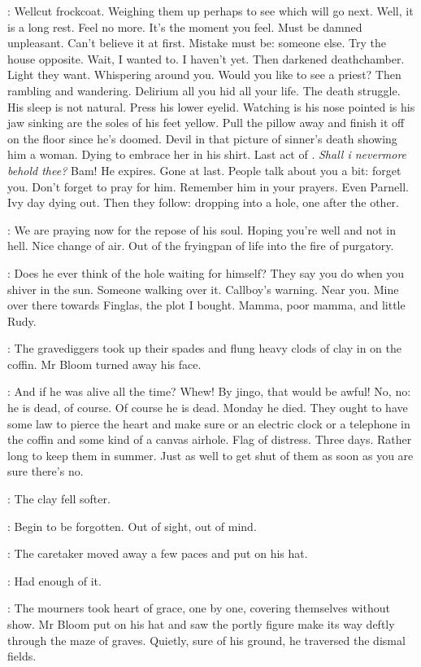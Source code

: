 \BloomInt:
Wellcut frockcoat.
Weighing them up perhaps to see which will go next.
Well, it is a long rest.
Feel no more.
It's the moment you feel.
Must be damned unpleasant.
Can't believe it at first.
Mistake must be:
someone else.
Try the house opposite.
Wait, I wanted to.
I haven't yet.
Then darkened deathchamber.
Light they want.
Whispering around you.
Would you like to see a priest?
Then rambling and wandering.
Delirium all you hid all your life.
The death struggle.
His sleep is not natural.
Press his lower eyelid.
Watching
is his nose pointed
is his jaw sinking
are the soles of his feet yellow.
Pull the pillow away and finish it off on the floor
since he's doomed.
Devil in that picture of sinner's death
showing him a woman.
Dying to embrace her in his shirt.
Last act of .
\emph{Shall i nevermore behold thee?}
Bam!
He expires.
Gone at last.
People talk about you a bit:
forget you.
Don't forget to pray for him.
Remember him in your prayers.
Even Parnell.
Ivy day dying out.
Then they follow:
dropping into a hole, one after the other.

\BloomInt:
We are praying now for the repose of his soul.
Hoping you're well and not in hell.
Nice change of air.
Out of the fryingpan of life into the fire of purgatory.

\BloomInt:
Does he ever think of the hole waiting for himself?
They say you do when you shiver in the sun.
Someone walking over it.
Callboy's warning.
Near you.
Mine over there towards Finglas, the plot I bought.
Mamma, poor mamma, and little Rudy.

:
The gravediggers took up their spades
and flung heavy clods of clay in on the coffin.
Mr Bloom turned away his face.

\BloomInt:
And if he was alive all the time?
Whew!
By jingo, that would be awful!
No, no:
he is dead, of course.
Of course he is dead.
Monday he died.
They ought to have some law to pierce the heart and make sure
or an electric clock or a telephone in the coffin
and some kind of a canvas airhole.
Flag of distress.
Three days.
Rather long to keep them in summer.
Just as well to get shut of them as soon as you are sure there's no.

:
The clay fell softer.

\BloomInt:
Begin to be forgotten.
Out of sight, out of mind.

:
The caretaker moved away a few paces and put on his hat.

\BloomInt:
Had enough of it.

:
The mourners took heart of grace,
one by one, covering themselves without show.
Mr Bloom put on his hat
and saw the portly figure make its way deftly through the maze of graves.
Quietly, sure of his ground,
he traversed the dismal fields.

